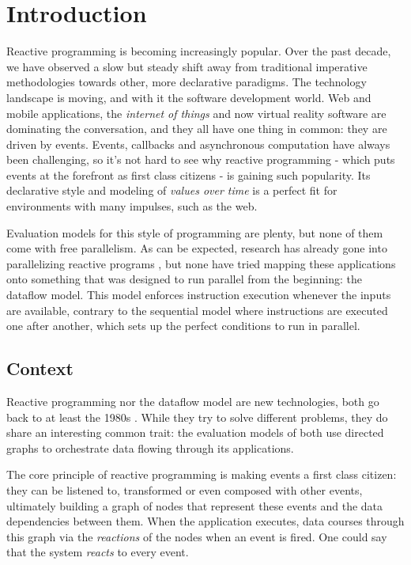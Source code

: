 
\chapter{Introduction}

Reactive programming is becoming increasingly popular. Over the past decade, we have observed a slow but steady shift away from traditional imperative methodologies towards other, more declarative paradigms.
The technology landscape is moving, and with it the software development world. Web and mobile applications, the \textit{internet of things} and now virtual reality software are dominating the conversation, and they all have one thing in common: they are driven by events. Events, callbacks and asynchronous computation have always been challenging, so it's not hard to see why reactive programming - which puts events at the forefront as first class citizens - is gaining such popularity. Its declarative style and modeling of \textit{values over time} is a perfect fit for environments with many impulses, such as the web.

Evaluation models for this style of programming are plenty, but none of them come with free parallelism. As can be expected, research has already gone into parallelizing reactive programs \citep{peterson_parallel_2000}, but none have tried mapping these applications onto something that was designed to run parallel from the beginning: the dataflow model. 
This model enforces instruction execution whenever the inputs are available, contrary to the sequential model where instructions are executed one after another, which sets up the perfect conditions to run in parallel.

\section{Context}

Reactive programming nor the dataflow model are new technologies, both go back to at least the 1980s \citep{harel_development_1985, veen_dataflow_1986}. While they try to solve different problems, they do share an interesting common trait: the evaluation models of both use directed graphs to orchestrate data flowing through its applications. 

The core principle of reactive programming is making events a first class citizen: they can be listened to, transformed or even composed with other events, ultimately building a graph of nodes that represent these events and the data dependencies between them. When the application executes, data courses through this graph via the \textit{reactions} of the nodes when an event is fired. One could say that the system \textit{reacts} to every event.

